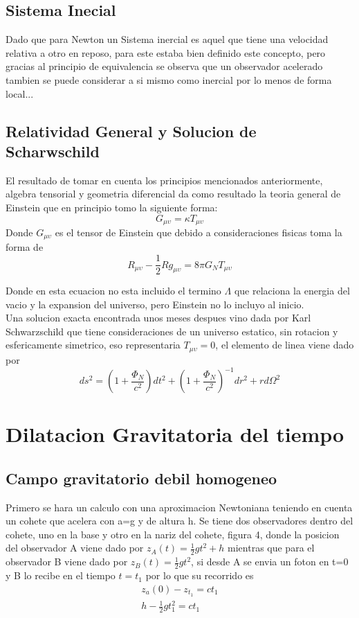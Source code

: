 \documentclass[12pt,twoside]{rif}
\begin{document}
	\subsection{Sistema Inecial}
	Dado que para Newton un Sistema inercial es aquel que tiene una velocidad relativa a otro en reposo, para este estaba bien definido este concepto, pero gracias al principio de equivalencia se observa que un observador acelerado tambien se puede considerar a si mismo como inercial por lo menos de forma local...
	\subsection{Relatividad General y Solucion de Scharwschild}
	El resultado de tomar en cuenta los principios mencionados anteriormente, algebra tensorial y geometria diferencial da como resultado la teoria general de Einstein que en principio tomo la siguiente forma:
	\begin{equation}
	G_{\mu\upsilon}=\kappa T_{\mu\upsilon}
	\end{equation}
Donde $G_{\mu\upsilon}$ es el tensor de Einstein que debido a consideraciones fisicas toma la forma de 
\begin{equation}
R_{\mu\upsilon}-\frac{1}{2}Rg_{\mu\upsilon}=8\pi G_{N}T_{\mu\upsilon}
\end{equation}	

Donde en esta ecuacion no esta incluido el termino $\Lambda$ que relaciona la energia del vacio y la expansion del universo, pero Einstein no lo incluyo al inicio.\\
Una solucion exacta encontrada unos meses despues vino dada por Karl Schwarzschild que tiene consideraciones de un universo estatico, sin rotacion y esfericamente simetrico, eso representaria $T_{\mu\upsilon}=0$, el elemento de linea viene dado por
\begin{equation}
ds^{2}=\left(1+\frac{\Phi_{N}}{c^{2}}\right)dt^{2}+\left(1+\frac{\Phi_{N}}{c^{2}}\right)^{-1}dr^{2}+rd\Omega^{2} 
\end{equation}



\section{Dilatacion Gravitatoria del tiempo}
	\subsection{Campo gravitatorio debil homogeneo}
	Primero se hara un calculo con una aproximacion Newtoniana teniendo en cuenta un cohete que acelera con a=g y de altura h. Se tiene dos observadores dentro del cohete, uno en la base y otro en la nariz del cohete, figura 4, donde la posicion del observador A viene dado por $z_{A}(t)=\frac{1}{2}gt^{2}+h $ mientras que para el observador B viene dado por $z_{B}(t)=\frac{1}{2}gt^{2}$, si desde A se envia un foton en t=0 y B lo recibe en el tiempo $t=t_{1}$ por lo que su recorrido es
\begin{eqnarray}
z_{a}(0)-z_{t_{1}}=ct_{1} \\
h-\frac{1}{2}gt_{1}^{2}=ct_{1}
\end{eqnarray}
\end{document}
